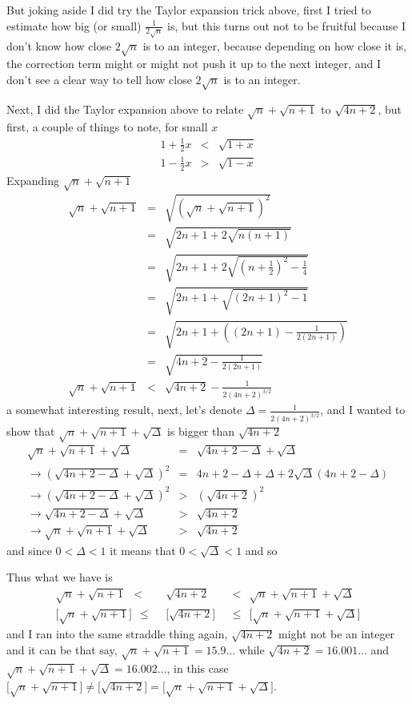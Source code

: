 \documentclass[aps,preprint,preprintnumbers,nofootinbib,showpacs,prd]{revtex4-1}
\newcommand{\nbea}{\begin{eqnarray*}}
\newcommand{\neea}{\end{eqnarray*}}
\begin{document}
But joking aside I did try the Taylor expansion trick above, first I tried to estimate how big (or small) $\frac{1}{2\sqrt{n}}$ is, but this turns out not to be fruitful because I don't know how close $2\sqrt{n}$ is to an integer, because depending on how close it is, the correction term might or might not push it up to the next integer, and I don't see a clear way to tell how close $2\sqrt{n}$ is to an integer.

Next, I did the Taylor expansion above to relate $\sqrt{n} + \sqrt{n+1}$ to $\sqrt{4n+2}$, but first, a couple of things to note, for small $x$
%
\nbea
1 + \frac{1}{2}x & < & \sqrt{1+x} \\
1 - \frac{1}{2}x & > & \sqrt{1-x}
\neea
%
Expanding $\sqrt{n} + \sqrt{n+1}$
%
\nbea
\sqrt{n} + \sqrt{n+1} & = & \sqrt{\left (\sqrt{n} + \sqrt{n+1} \right )^2} \\
& = & \sqrt{2n + 1 + 2\sqrt{n(n+1)}} \\
& = & \sqrt{2n + 1 + 2\sqrt{\left (n+\frac{1}{2}\right )^2 - \frac{1}{4}}} \\
& = & \sqrt{2n + 1 + \sqrt{\left (2n+1\right )^2 - 1}} \\
& = & \sqrt{2n + 1 + \left((2n+1) -\frac{1}{2(2n+1)} \right)} \\
& = & \sqrt{4n + 2 -\frac{1}{2(2n+1)}} \\
\sqrt{n} + \sqrt{n+1} & < & \sqrt{4n+2} - \frac{1}{2(4n+2)^{3/2}}
\neea
%
a somewhat interesting result, next, let's denote $\Delta = \frac{1}{2(4n+2)^{3/2}}$, and I wanted to show that $\sqrt{n} + \sqrt{n+1} + \sqrt{\Delta}$ is bigger than $\sqrt{4n + 2}$
%
\nbea
\sqrt{n} + \sqrt{n+1} + \sqrt{\Delta} & = & \sqrt{4n + 2 -\Delta} + \sqrt{\Delta} \\
\to \left ( \sqrt{4n + 2 -\Delta} + \sqrt{\Delta} \right )^2 & = & 4n + 2 - \Delta + \Delta + 2\sqrt{\Delta}(4n + 2 - \Delta) \\
\to \left ( \sqrt{4n + 2 -\Delta} + \sqrt{\Delta} \right )^2 & > & \left ( \sqrt{4n + 2} \right )^2 \\
\to \sqrt{4n + 2 -\Delta} + \sqrt{\Delta} & > & \sqrt{4n + 2} \\
\to \sqrt{n} + \sqrt{n+1} + \sqrt{\Delta} & > & \sqrt{4n + 2}
\neea
%
and since $0 < \Delta < 1$ it means that $0 < \sqrt{\Delta}<1$ and so

Thus what we have is
%
\nbea
\sqrt{n} + \sqrt{n+1}~~ <~~ & \sqrt{4n + 2} & ~~<~~ \sqrt{n} + \sqrt{n+1} + \sqrt{\Delta} \\
\lbrack\sqrt{n} + \sqrt{n+1}\rbrack~~ \le~~ & \lbrack\sqrt{4n + 2}\rbrack & ~~\le~~ \lbrack\sqrt{n} + \sqrt{n+1} + \sqrt{\Delta}\rbrack
\neea
%
and I ran into the same straddle thing again, $\sqrt{4n + 2}$ might not be an integer and it can be that say, $\sqrt{n} + \sqrt{n+1} = 15.9\ldots$ while $\sqrt{4n + 2} = 16.001\ldots$ and $\sqrt{n} + \sqrt{n+1} + \sqrt{\Delta} = 16.002\ldots$, in this case $\lbrack\sqrt{n} + \sqrt{n+1}\rbrack \neq \lbrack\sqrt{4n + 2}\rbrack = \lbrack\sqrt{n} + \sqrt{n+1} + \sqrt{\Delta}\rbrack$.
\end{document}
